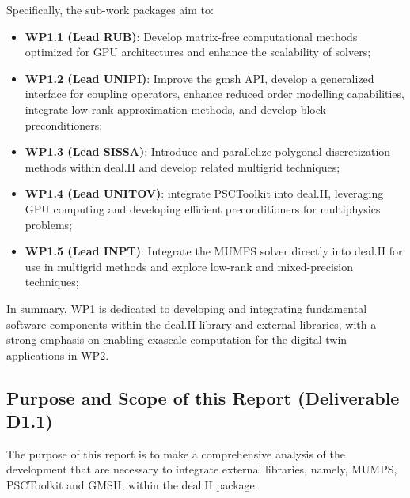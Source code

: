 \documentclass[a4paper,12pt]{article}
\begin{document}
Specifically, the sub-work packages aim to:
\begin{itemize}
\item \textbf{WP1.1 (Lead RUB)}: Develop matrix-free computational
  methods optimized for GPU architectures and enhance the scalability
  of solvers;
    \item \textbf{WP1.2 (Lead UNIPI)}: Improve the gmsh API, develop a
      generalized interface for coupling operators, enhance reduced
      order modelling capabilities, integrate low-rank approximation
      methods, and develop block preconditioners;
    \item \textbf{WP1.3 (Lead SISSA)}: Introduce and parallelize
      polygonal discretization methods within deal.II and develop
      related multigrid techniques;
    \item \textbf{WP1.4 (Lead UNITOV)}: integrate PSCToolkit into
      deal.II, leveraging GPU computing and developing efficient
      preconditioners for multiphysics problems;
    \item \textbf{WP1.5 (Lead INPT)}: Integrate the MUMPS solver
      directly into deal.II for use in multigrid methods and explore
      low-rank and mixed-precision techniques;
\end{itemize}

In summary, WP1 is dedicated to developing and integrating fundamental
software components within the deal.II library and external libraries,
with a strong emphasis on enabling exascale computation for the
digital twin applications in WP2.

\subsection{Purpose and Scope of this Report (Deliverable D1.1)}

The purpose of this report is to make a comprehensive analysis of the
development that are necessary to integrate external libraries,
namely, MUMPS, PSCToolkit and GMSH, within the deal.II package. 


\end{document}
